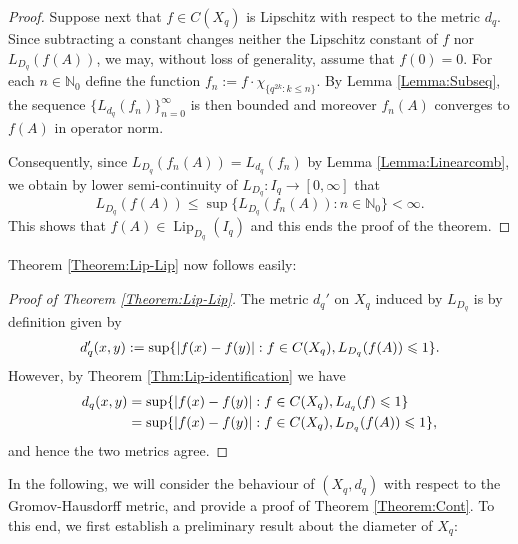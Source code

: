 \documentclass[11pt, reqno, a4paper, final]{amsart}
\theoremstyle{plain}
\theoremstyle{definition}
\newcommand{\NN}{{\mathbb N}}
\renewcommand{\leq}{\leqslant}
\newcommand{\Lip}{\operatorname{Lip}}
\newcommand{\black}{\color{black}}
\begin{document}
\begin{proof}
Suppose next that $f\in C(X_q)$ is Lipschitz with respect to the metric $d_q$. Since subtracting a constant changes neither the Lipschitz constant of $f$ nor $L_{D_q}(f(A))$, we may, {\black without loss of generality}, assume that $f(0)=0$. {\black For each $n \in \NN_0$ define the function $f_n := f \cdot \chi_{\{q^{2k} : k\leq n\}}$.} By Lemma \ref{Lemma:Subseq}, the sequence $\lbrace L_{d_q}(f_n)\rbrace_{n=0}^\infty$ is then bounded and moreover $f_n(A)$ converges to $f(A)$ in operator norm. 

Consequently, since $L_{D_q}(f_n(A))=L_{d_q}(f_n)$ by Lemma \ref{Lemma:Linearcomb}, {\black we obtain by lower semi-continuity of $L_{D_q} : I_q \to [0,\infty]$ that
\[
L_{D_q}(f(A)) \leq \sup\lbrace L_{D_q}(f_n(A)) : n \in \NN_0 \rbrace < \infty .
\]
This shows that $f(A) \in \Lip_{D_q}(I_q)$ and this ends the proof of the theorem.}
\end{proof}

Theorem \ref{Theorem:Lip-Lip} now follows easily:
\begin{proof}[Proof of Theorem \ref{Theorem:Lip-Lip}]
The metric $d_q'$ on $X_q$ induced by $L_{D_q}$ is by definition given by
\begin{align*}
d_q'(x,y):=\sup\{|f(x)- f(y)| : f \in {\black C(X_q)}, L_{D_q}(f(A))\leq 1\}.
\end{align*}
However, by Theorem \ref{Thm:Lip-identification} we have
\begin{align*}
d_q(x,y)&= \sup\{ |f(x)-f(y)| : f\in {\black C(X_q)}, L_{d_q}(f)\leq 1\}\\
&=\sup\{|f(x)-f(y)| : f\in {\black C(X_q)}, L_{D_q}(f(A))\leq 1\},
\end{align*}
and hence the two metrics agree.
\end{proof}
In the following, we will consider the behaviour of $(X_q,d_q)$ with respect to the Gromov-Hausdorff metric, and provide a proof of Theorem \ref{Theorem:Cont}. {\black To this end, we first establish a preliminary result about the diameter of $X_q$:}
\end{document}
